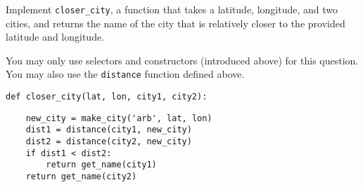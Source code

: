 \question Implement {\tt closer\_city}, a function that takes a
latitude, longitude, and two cities, and returns the name of the city
that is relatively closer to the provided latitude and longitude.

You may only use selectors and constructors (introduced above) for
this question. You may also use the {\tt distance} function defined above.

\begin{lstlisting}
def closer_city(lat, lon, city1, city2):
\end{lstlisting}
\begin{solution}[1.5in]
\begin{lstlisting}
    new_city = make_city('arb', lat, lon)
    dist1 = distance(city1, new_city)
    dist2 = distance(city2, new_city)
    if dist1 < dist2:
        return get_name(city1)
    return get_name(city2)
\end{lstlisting}
\end{solution}

